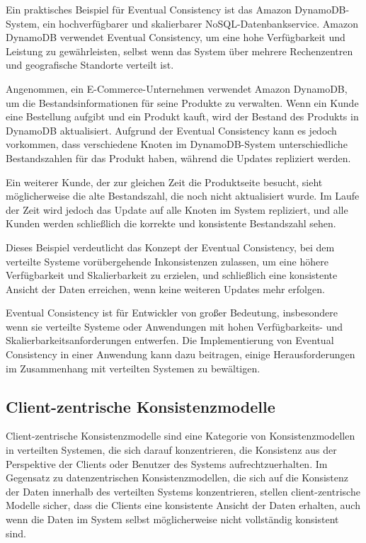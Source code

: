 Ein praktisches Beispiel für Eventual Consistency ist das Amazon DynamoDB-System, ein hochverfügbarer und skalierbarer NoSQL-Datenbankservice. Amazon DynamoDB verwendet Eventual Consistency, um eine hohe Verfügbarkeit und Leistung zu gewährleisten, selbst wenn das System über mehrere Rechenzentren und geografische Standorte verteilt ist.

Angenommen, ein E-Commerce-Unternehmen verwendet Amazon DynamoDB, um die Bestandsinformationen für seine Produkte zu verwalten. Wenn ein Kunde eine Bestellung aufgibt und ein Produkt kauft, wird der Bestand des Produkts in DynamoDB aktualisiert. Aufgrund der Eventual Consistency kann es jedoch vorkommen, dass verschiedene Knoten im DynamoDB-System unterschiedliche Bestandszahlen für das Produkt haben, während die Updates repliziert werden.

Ein weiterer Kunde, der zur gleichen Zeit die Produktseite besucht, sieht möglicherweise die alte Bestandszahl, die noch nicht aktualisiert wurde. Im Laufe der Zeit wird jedoch das Update auf alle Knoten im System repliziert, und alle Kunden werden schließlich die korrekte und konsistente Bestandszahl sehen.

Dieses Beispiel verdeutlicht das Konzept der Eventual Consistency, bei dem verteilte Systeme vorübergehende Inkonsistenzen zulassen, um eine höhere Verfügbarkeit und Skalierbarkeit zu erzielen, und schließlich eine konsistente Ansicht der Daten erreichen, wenn keine weiteren Updates mehr erfolgen.

Eventual Consistency ist für Entwickler von großer Bedeutung, insbesondere wenn sie verteilte Systeme oder Anwendungen mit hohen Verfügbarkeits- und Skalierbarkeitsanforderungen entwerfen. Die Implementierung von Eventual Consistency in einer Anwendung kann dazu beitragen, einige Herausforderungen im Zusammenhang mit verteilten Systemen zu bewältigen.


\subsection{Client-zentrische Konsistenzmodelle}
Client-zentrische Konsistenzmodelle sind eine Kategorie von Konsistenzmodellen in verteilten Systemen, die sich darauf konzentrieren, die Konsistenz aus der Perspektive der Clients oder Benutzer des Systems aufrechtzuerhalten. Im Gegensatz zu datenzentrischen Konsistenzmodellen, die sich auf die Konsistenz der Daten innerhalb des verteilten Systems konzentrieren, stellen client-zentrische Modelle sicher, dass die Clients eine konsistente Ansicht der Daten erhalten, auch wenn die Daten im System selbst möglicherweise nicht vollständig konsistent sind.


